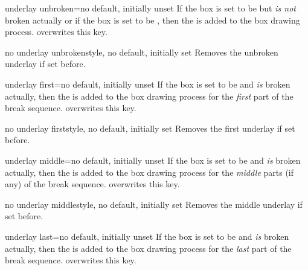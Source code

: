 \enlargethispage*{1cm}

\begin{docTcbKey}{underlay unbroken}{=}{no default, initially unset}
  If the box is set to be  but \emph{is not} broken actually
  or if the box is set to be ,
  then the  is added to the box drawing process.
   overwrites this key.
\end{docTcbKey}

\begin{docTcbKey}{no underlay unbroken}{}{style, no default, initially set}
  Removes the unbroken underlay if set before.
\end{docTcbKey}

\begin{docTcbKey}{underlay first}{=}{no default, initially unset}
  If the box is set to be  and \emph{is} broken actually,
  then the  is added to the box drawing process for
  the \emph{first} part of the break sequence.
   overwrites this key.
\end{docTcbKey}

\begin{docTcbKey}{no underlay first}{}{style, no default, initially set}
  Removes the first underlay if set before.
\end{docTcbKey}

\begin{docTcbKey}{underlay middle}{=}{no default, initially unset}
  If the box is set to be  and \emph{is} broken actually,
  then the  is added to the box drawing process for
  the \emph{middle} parts (if any) of the break sequence.
   overwrites this key.
\end{docTcbKey}

\begin{docTcbKey}{no underlay middle}{}{style, no default, initially set}
  Removes the middle underlay if set before.
\end{docTcbKey}

\begin{docTcbKey}{underlay last}{=}{no default, initially unset}
  If the box is set to be  and \emph{is} broken actually,
  then the  is added to the box drawing process for
  the \emph{last} part of the break sequence.
   overwrites this key.
\end{docTcbKey}

